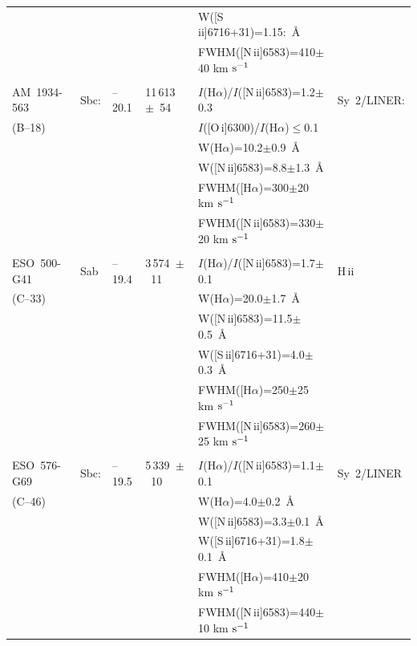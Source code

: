 \begin{table}
\begin{tabular}{llllll}
	 &      &&  & W([S\,{\sc ii}]6716+31)=1.15:~\AA &   \\
         &      &&  & FWHM([N\,{\sc ii}]6583)=410$\pm$40 km $\rm s^{-1}$ & \\
         &      &&  &                                 & \\
AM~1934-563& Sbc: & --20.1&11\,613~$\pm$~54    &
$I$(H$\alpha$)/$I$([N\,{\sc ii}]6583)=1.2$\pm$0.3& Sy~2/LINER: \\
(B--18)  &      &&  & $I$([O\,{\sc i}]6300)/$I$(H$\alpha$)$\leq$0.1 & \\
         &      &&  & W(H$\alpha$)=10.2$\pm$0.9~\AA &  \\
         &      &&  & W([N\,{\sc ii}]6583)=8.8$\pm$1.3~\AA &  \\
         &      &&  & FWHM([H$\alpha$)=300$\pm$20 km $\rm s^{-1}$ & \\
         &      &&  & FWHM([N\,{\sc ii}]6583)=330$\pm$20 km $\rm s^{-1}$ & \\
         &      &&                        &                &                \\
ESO~500-G41& Sab& --19.4 &3\,574~$\pm$~11 &
$I$(H$\alpha$)/$I$([N\,{\sc ii}]6583)=1.7$\pm$0.1 & H\,{\sc ii}  \\
(C--33)  &      &&  & W(H$\alpha$)=20.0$\pm$1.7~\AA &  \\
         &      &&  & W([N\,{\sc ii}]6583)=11.5$\pm$0.5~\AA &  \\
	 &      &&  & W([S\,{\sc ii}]6716+31)=4.0$\pm$0.3~\AA &   \\
         &      &&  & FWHM([H$\alpha$)=250$\pm$25 km $\rm s^{-1}$ & \\
         &      &&  & FWHM([N\,{\sc ii}]6583)=260$\pm$25 km $\rm s^{-1}$ & \\
         &      &&                        &                &                \\
ESO~576-G69& Sbc: & --19.5 &5\,339~$\pm$~10 &
$I$(H$\alpha$)/$I$([N\,{\sc ii}]6583)=1.1$\pm$0.1 & Sy~2/LINER  \\
(C--46)  &      &&  & W(H$\alpha$)=4.0$\pm$0.2~\AA &  \\
         &      &&  & W([N\,{\sc ii}]6583)=3.3$\pm$0.1~\AA &  \\
	 &      &&  & W([S\,{\sc ii}]6716+31)=1.8$\pm$0.1~\AA &   \\
         &      &&  & FWHM([H$\alpha$)=410$\pm$20 km $\rm s^{-1}$ & \\
         &      &&  & FWHM([N\,{\sc ii}]6583)=440$\pm$10 km $\rm s^{-1}$ & \\

\end{tabular}
\end{table}

